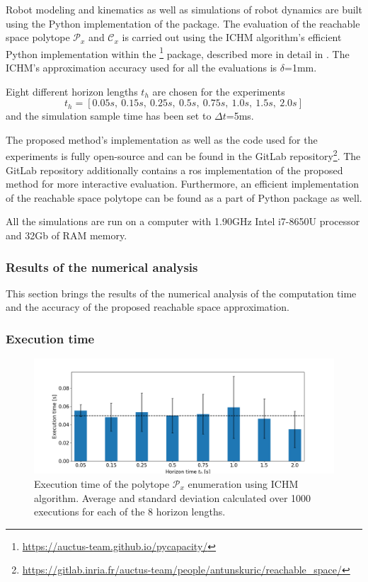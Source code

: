 Robot modeling and kinematics as well as simulations of robot dynamics are built using the Python implementation of the  \cite{rtb} package. 
The evaluation of the reachable space polytope $\mathcal{P}_x$ and $\mathcal{C}_x$ is carried out using the ICHM algorithm's efficient Python implementation within the \footnote{\url{https://auctus-team.github.io/pycapacity/}} package, described more in detail in . The ICHM's approximation accuracy used for all the evaluations is $\delta$=1mm.

Eight different horizon lengths $t_h$ are chosen for the experiments
$$
t_h = [0.05s, ~ 0.15s, ~ 0.25s, ~ 0.5s,~ 0.75s,~ 1.0s,~ 1.5s, ~ 2.0s]
$$
and the simulation sample time has been set to $\Delta t$=5ms. 

The proposed method's implementation as well as the code used for the experiments is fully open-source and can be found in the GitLab repository\footnote{\url{https://gitlab.inria.fr/auctus-team/people/antunskuric/reachable_space/}}. The GitLab repository additionally contains a \gls{ros} \cite{ros} implementation of the proposed method for more interactive evaluation. Furthermore, an efficient implementation of the reachable space polytope can be found as a part of  Python package as well.

All the simulations are run on a computer with 1.90GHz Intel i7-8650U processor and 32Gb of RAM memory.
 
\subsubsection{Results of the numerical analysis}
\label{ch:results}

This section brings the results of the numerical analysis of the computation time and the accuracy of the proposed reachable space approximation.

\subsubsection*{Execution time}

\begin{figure}[!t]
    \centering
    \includegraphics[width=\linewidth]{Papers/images/time.png}
    
    \caption{Execution time of the polytope $\mathcal{P}_x$ enumeration using ICHM algorithm. Average and standard deviation calculated over 1000 executions for each of the 8 horizon lengths.}
    \label{fig:exec_time}

\end{figure}

